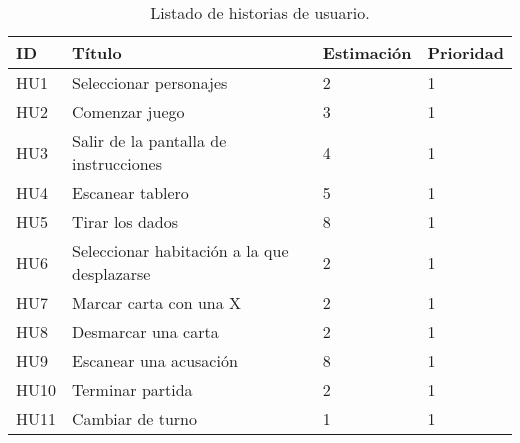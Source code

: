 
\begin{table}[h]
  \begin{center}
    \begin{tabular}{|p{1cm}|p{7.5cm}|p{1.9cm}|p{1.6cm}|}

      \hline
        \rowcolor{Gray} \textbf{ID}
        & \textbf{Título}
        & \textbf{Estimación}
        & \textbf{Prioridad}\\

      \hline
      HU1
      & Seleccionar personajes
      & 2
      & 1\\

      \hline
      HU2
      & Comenzar juego
      & 3
      & 1\\

      \hline
      HU3
      & Salir de la pantalla de instrucciones
      & 4
      & 1\\

      \hline
      HU4
      & Escanear tablero
      & 5
      & 1\\

      \hline
      HU5
      & Tirar los dados
      & 8
      & 1\\

      \hline
      HU6
      & Seleccionar habitación a la que desplazarse
      & 2
      & 1\\

      \hline
      HU7
      & Marcar carta con una X
      & 2
      & 1\\

      \hline
      HU8
      & Desmarcar una carta
      & 2
      & 1\\

      \hline
      HU9
      & Escanear una acusación
      & 8
      & 1\\

      \hline
      HU10
      & Terminar partida
      & 2
      & 1\\

      \hline
      HU11
      & Cambiar de turno
      & 1
      & 1\\

      \hline

    \end{tabular}

    \caption{Listado de historias de usuario.}
    \label{tabla-lista-historias-usuario}

  \end{center}
\end{table}

